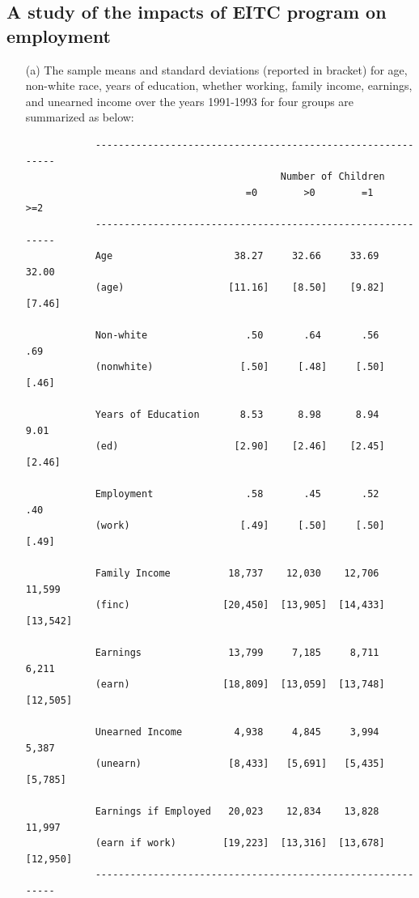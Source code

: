 \documentclass{article}
\begin{document}
\subsection*{A study of the impacts of EITC program on employment}
\begin{enumerate}

\item[(a)]  The sample means and standard deviations (reported in bracket) for age, non-white race, 
years of education, whether working, family income, earnings, and unearned income over the years
1991-1993 for four groups are summarized as below:

    \begin{verbatim}
            ------------------------------------------------------------
                                            Number of Children
                                      =0        >0        =1       >=2 
            ------------------------------------------------------------
            Age                     38.27     32.66     33.69     32.00 
            (age)                  [11.16]    [8.50]    [9.82]    [7.46]
                                    
            Non-white                 .50       .64       .56       .69 
            (nonwhite)               [.50]     [.48]     [.50]     [.46]
                                 
            Years of Education       8.53      8.98      8.94      9.01 
            (ed)                    [2.90]    [2.46]    [2.45]    [2.46]
                                 
            Employment                .58       .45       .52       .40  
            (work)                   [.49]     [.50]     [.50]     [.49]
                                 
            Family Income          18,737    12,030    12,706    11,599 
            (finc)                [20,450]  [13,905]  [14,433]  [13,542]
                                 
            Earnings               13,799     7,185     8,711     6,211 
            (earn)                [18,809]  [13,059]  [13,748]  [12,505]
                                 
            Unearned Income         4,938     4,845     3,994     5,387
            (unearn)               [8,433]   [5,691]   [5,435]   [5,785]
                                 
            Earnings if Employed   20,023    12,834    13,828    11,997
            (earn if work)        [19,223]  [13,316]  [13,678]  [12,950]
            ------------------------------------------------------------
    \end{verbatim}


\end{enumerate}
\end{document}
